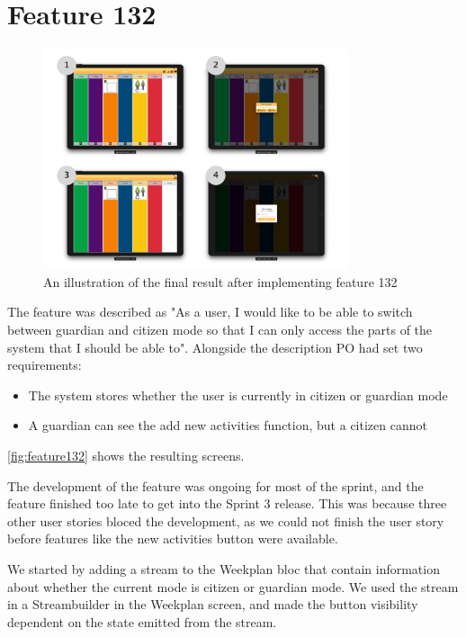 \section{Feature 132}
\begin{figure}[h]
    \centering
    \includegraphics[width=0.8\textwidth]{figures/feature_132.pdf}
    \caption{An illustration of the final result after implementing feature 132}
    \label{fig:feature132}
\end{figure}

The feature was described as "As a user, I would like to be able to switch between guardian and citizen mode so that I can only access the parts of the system that I should be able to". Alongside the description \gls{PO} had set two requirements:

\begin{itemize}
  \item The system stores whether the user is currently in citizen or guardian mode
  \item A guardian can see the add new activities function, but a citizen cannot
\end{itemize}
\autoref{fig:feature132} shows the resulting screens.

The development of the feature was ongoing for most of the sprint, and the feature finished too late to get into the Sprint 3 release. This was because three other user stories bloced the development, as we could not finish the user story before features like the new activities button were available.

We started by adding a stream to the Weekplan \gls{bloc} that contain information about whether the current mode is citizen or guardian mode. We used the stream in a Streambuilder in the Weekplan screen, and made the button visibility dependent on the state emitted from the stream.

